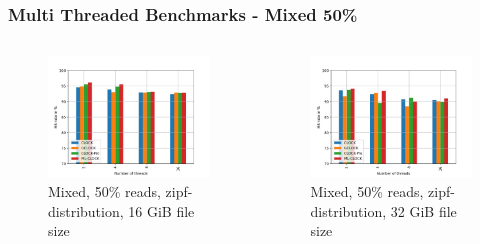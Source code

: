 \documentclass[
	aspectratio=169,
	compress,
]{beamer}
\newcommand{\navframetitle}[1]{\frametitle{#1\hfill{\footnotesize\lastsection{}}}}
\begin{document}

\begin{frame}[fragile]
	\navframetitle{Multi Threaded Benchmarks - Mixed 50\%}

	\begin{columns}
		\begin{column}{0.5\textwidth}
			\begin{figure}[ht]
    			\centering
    			\includegraphics[width=\textwidth]{multi_16_gb_rw_50to50_zipf.jpg}
        		\caption{Mixed, 50\% reads, zipf-distribution, 16 GiB file size}
			\end{figure}
		\end{column}
		\begin{column}{0.5\textwidth}
			\begin{figure}[ht]
    			\centering
    			\includegraphics[width=\textwidth]{multi_32_gb_rw_50to50_zipf.jpg}
        		\caption{Mixed, 50\% reads, zipf-distribution, 32 GiB file size}
			\end{figure}			
		\end{column}
	\end{columns}
\end{frame}
\end{document}

